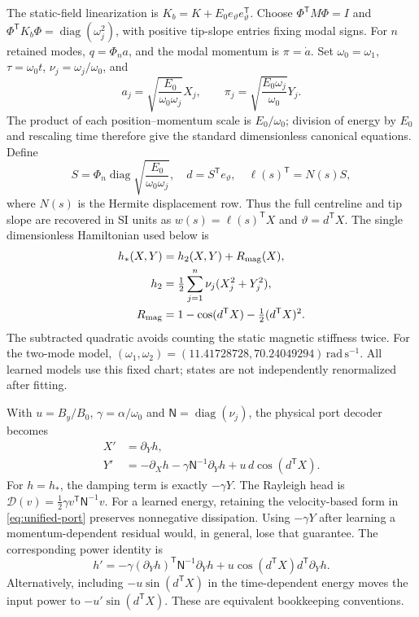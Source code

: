 The static-field linearization is
$K_b=K+E_0e_\vartheta e_\vartheta^{\mathsf T}$.
Choose $\Phi^{\mathsf T}M\Phi=I$ and
$\Phi^{\mathsf T}K_b\Phi=\operatorname{diag}(\omega_j^2)$,
with positive tip-slope entries fixing modal signs. For $n$ retained modes,
$q=\Phi_n a$, and the modal momentum is $\pi=\dot a$.
Set $\omega_0=\omega_1$, $\tau=\omega_0t$, $\nu_j=\omega_j/\omega_0$,
and
\begin{equation}
 a_j=\sqrt{\frac{E_0}{\omega_0\omega_j}}X_j,
 \qquad
 \pi_j=\sqrt{\frac{E_0\omega_j}{\omega_0}}Y_j.
 \label{eq:unified-scale}
\end{equation}
The product of each position--momentum scale is $E_0/\omega_0$;
division of energy by $E_0$ and rescaling time therefore give the standard
dimensionless canonical equations. Define
\begin{equation}
 S=\Phi_n\operatorname{diag}\sqrt{\frac{E_0}{\omega_0\omega_j}},
 \quad d=S^{\mathsf T}e_\vartheta,\quad
 \ell(s)^{\mathsf T}=N(s)S,
\end{equation}
where $N(s)$ is the Hermite displacement row. Thus the full centreline
and tip slope are recovered in SI units as
$w(s)=\ell(s)^{\mathsf T}X$ and $\vartheta=d^{\mathsf T}X$.
The single dimensionless Hamiltonian used below is
\begin{align}
 h_*(X,Y)&=h_2(X,Y)+R_{\rm mag}(X),\\
 h_2&=\tfrac12\sum_{j=1}^n\nu_j(X_j^2+Y_j^2),\\
 R_{\rm mag}&=1-\cos(d^{\mathsf T}X)-\tfrac12(d^{\mathsf T}X)^2.
 \label{eq:unified-h}
\end{align}
The subtracted quadratic avoids counting the static magnetic stiffness
twice. For the two-mode model,
$(\omega_1,\omega_2)=(11.41728728,70.24049294)\,\mathrm{rad\,s^{-1}}$.
All learned models use this fixed chart; states are not independently
renormalized after fitting.

With $u=B_y/B_0$, $\gamma=\alpha/\omega_0$ and
$\mathsf N=\operatorname{diag}(\nu_j)$, the physical port decoder becomes
\begin{align}
 X'&=\partial_Y h,\\
 Y'&=-\partial_X h-\gamma\mathsf N^{-1}\partial_Yh
          +u\,d\cos(d^{\mathsf T}X).
 \label{eq:unified-port}
\end{align}
For $h=h_*$, the damping term is exactly $-\gamma Y$.
The Rayleigh head is
$\mathcal D(v)=\tfrac12\gamma v^{\mathsf T}\mathsf N^{-1}v$.
For a learned energy, retaining the velocity-based form in
\eqref{eq:unified-port} preserves nonnegative dissipation. Using
$-\gamma Y$ after learning a momentum-dependent residual would, in
general, lose that guarantee. The corresponding power identity is
\begin{equation}
 h'=-\gamma(\partial_Yh)^{\mathsf T}\mathsf N^{-1}\partial_Yh
       +u\cos(d^{\mathsf T}X)d^{\mathsf T}\partial_Yh.
 \label{eq:unified-power}
\end{equation}
Alternatively, including $-u\sin(d^{\mathsf T}X)$ in the time-dependent
energy moves the input power to $-u'\sin(d^{\mathsf T}X)$.
These are equivalent bookkeeping conventions.

